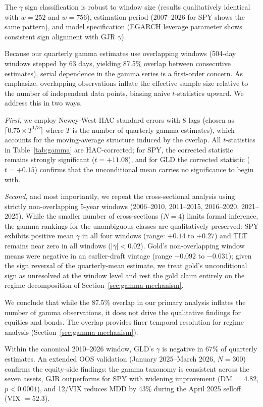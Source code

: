 The $\gamma$ sign classification is robust to window size (results qualitatively identical with $w = 252$ and $w = 756$), estimation period (2007--2026 for SPY shows the same pattern), and model specification (EGARCH leverage parameter shows consistent sign alignment with GJR $\gamma$).

Because our quarterly gamma estimates use overlapping windows (504-day windows stepped by 63 days, yielding 87.5\% overlap between consecutive estimates), serial dependence in the gamma series is a first-order concern. As \citet{harri2009} emphasize, overlapping observations inflate the effective sample size relative to the number of independent data points, biasing naive $t$-statistics upward. We address this in two ways.

\textit{First}, we employ Newey-West HAC standard errors \citep{newey1987} with 8 lags (chosen as $\lceil 0.75 \times T^{1/3} \rceil$ where $T$ is the number of quarterly gamma estimates), which accounts for the moving-average structure induced by the overlap. All $t$-statistics in Table~\ref{tab:gamma} are HAC-corrected; for SPY, the corrected statistic remains strongly significant ($t = +11.08$), and for GLD the corrected statistic ($t = +0.15$) confirms that the unconditional mean carries no significance to begin with.


\textit{Second}, and most importantly, we repeat the cross-sectional analysis using strictly non-overlapping 5-year windows (2006--2010, 2011--2015, 2016--2020, 2021--2025). While the smaller number of cross-sections ($N = 4$) limits formal inference, the gamma rankings for the unambiguous classes are qualitatively preserved: SPY exhibits positive mean $\gamma$ in all four windows (range: $+0.14$ to $+0.27$) and TLT remains near zero in all windows ($|\bar{\gamma}| < 0.02$). Gold's non-overlapping window means were negative in an earlier-draft vintage (range $-0.092$ to $-0.031$); given the sign reversal of the quarterly-mean estimate, we treat gold's unconditional sign as unresolved at the window level and rest the gold claim entirely on the regime decomposition of Section~\ref{sec:gamma-mechanism}.

We conclude that while the 87.5\% overlap in our primary analysis inflates the number of gamma observations, it does not drive the qualitative findings for equities and bonds. The overlap provides finer temporal resolution for regime analysis (Section~\ref{sec:gamma-mechanism}).

Within the canonical 2010--2026 window, GLD's $\gamma$ is negative in 67\% of quarterly estimates. An extended OOS validation (January 2025--March 2026, $N = 300$) confirms the equity-side findings: the gamma taxonomy is consistent across the seven assets, GJR outperforms for SPY with widening improvement (DM $= 4.82$, $p < 0.0001$), and 12/VIX reduces MDD by 43\% during the April 2025 selloff (VIX $= 52.3$).

